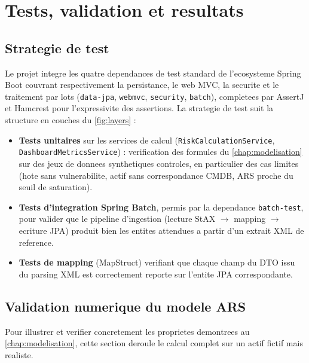 \chapter{Tests, validation et resultats}
\label{chap:tests}

\section{Strategie de test}

Le projet integre les quatre dependances de test standard de l'ecosysteme Spring
Boot couvrant respectivement la persistance, le web MVC, la securite et le
traitement par lots (\texttt{data-jpa}, \texttt{webmvc}, \texttt{security},
\texttt{batch}), completees par AssertJ et Hamcrest pour l'expressivite des
assertions. La strategie
de test suit la structure en couches du \cref{fig:layers} :

\begin{itemize}
  \item \textbf{Tests unitaires} sur les services de calcul (\texttt{Risk\-Calculation\-Service},
  \texttt{Dashboard\-Metrics\-Service}) : verification des formules du
  \cref{chap:modelisation} sur des jeux de donnees synthetiques controles, en
  particulier des cas limites (hote sans vulnerabilite, actif sans correspondance
  CMDB, ARS proche du seuil de saturation).
  \item \textbf{Tests d'integration Spring Batch}, permis par la dependance
  \texttt{batch-test}, pour valider que le pipeline
  d'ingestion (lecture StAX $\to$ mapping $\to$ ecriture JPA) produit bien les
  entites attendues a partir d'un extrait XML de reference.
  \item \textbf{Tests de mapping} (MapStruct) verifiant que chaque champ du DTO issu
  du parsing XML est correctement reporte sur l'entite JPA correspondante.
\end{itemize}

\section{Validation numerique du modele ARS}
\label{sec:validation-numerique}

Pour illustrer et verifier concretement les proprietes demontrees au
\cref{chap:modelisation}, cette section deroule le calcul complet sur un actif
fictif mais realiste.


